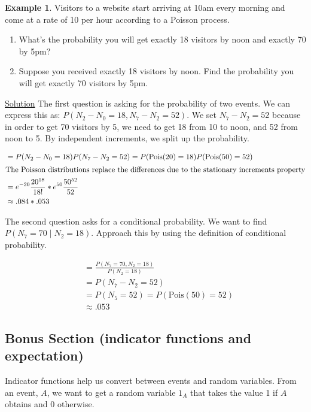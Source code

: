 \documentclass[12pt]{article}
\theoremstyle{definition}
\newtheorem{example}{Example}[section]
\begin{document}
\begin{example}
  Visitors to a website start arriving at 10am every morning and come at a rate of 10 per hour according to a Poisson process.

  \begin{enumerate}
    \item What's the probability you will get exactly 18 visitors by noon and exactly 70 by 5pm?
    \item Suppose you received exactly 18 visitors by noon. Find the probability you will get exactly 70 visitors by 5pm.
  \end{enumerate}

\underline{Solution}
The first question is asking for the probability of two events. We can express this as: $P(N_2 - N_0 = 18, N_7 - N_2 = 52)$. We set $N_7 - N_2 = 52$ because in order to get 70 visitors by 5, we need to get 18 from 10 to noon, and 52 from noon to 5. By independent increments, we split up the probability.

\begin{align*}
  &= P(N_2 - N_0 = 18)P(N_7 - N_2 = 52) = P(\text{Pois}(20) = 18)P(\text{Pois}(50) = 52) \\
  \intertext{The Poisson distributions replace the differences due to the stationary increments property}
  & = e^{-20}\frac{20^{18}}{18!} * e^{50}\frac{50^{52}}{52} \\
  &\approx .084 * .053
\end{align*}

The second question asks for a conditional probability. We want to find $P(N_7  = 70 \mid N_2 = 18)$. Approach this by using the definition of conditional probability.

\begin{align*}
  &= \frac{P(N_7 = 70, N_2 = 18)}{P(N_2 = 18)} \\
  &= P(N_7 - N_2 = 52) \\
  &= P(N_5 = 52) = P( \text{Pois}(50) = 52) \\
  &\approx .053
\end{align*}

\end{example}

\subsection{Bonus Section (indicator functions and expectation)}

Indicator functions help us convert between events and random variables. From an event, $A$, we want to get a random variable $1_A$ that takes the value 1 if $A$ obtains and 0 otherwise.
\end{document}
